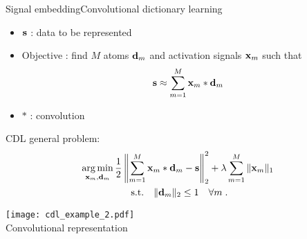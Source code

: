\begin{frame}{Signal embedding}{Convolutional dictionary learning}
\begin{minipage}[t]{0.45\linewidth}
    \begin{itemize}
        \item $\mathbf{s}$ : data to be represented
        \item Objective : find $M$ atoms $\mathbf{d}_m$ and activation signals $\mathbf{x}_m$ such that
        $$\mathbf{s} \approx \sum_{m=1}^{M}\mathbf{x}_m * \mathbf{d}_m$$
        \item $*$ : convolution
    \end{itemize}
    \pause[3]
    CDL general problem:
    \begin{gather*}\label{eq:cdl_baseform}
    \operatorname*{arg\,min}_{\mathbf{x}_m,\mathbf{d}_m} \frac{1}{2} \left\| \sum_{m=1}^{M} \mathbf{x}_{m} * \mathbf{d}_m - \mathbf{s} \right\|_2^2 + \lambda \sum_{m=1}^{M} \|\mathbf{x}_m \|_1 \ \\
        \text{s.t.}\quad \| \mathbf{d}_m\|_2 \leq 1 \quad \forall m \;. \nonumber
    \end{gather*}
\end{minipage}\hfill
\begin{minipage}[t]{0.4\linewidth}
    \centering
    \pause[2]
        \centering
        \texttt{[image: cdl\_example\_2.pdf]}\\
        \smallskip
        {\small Convolutional representation}
\end{minipage}

\end{frame}

